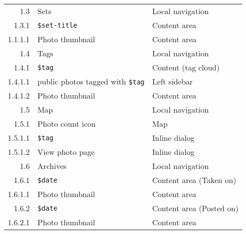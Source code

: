 \documentclass[12pt,a4paper]{article}
\newcommand{\var}[1]{\texttt{\${#1}}}
\begin{document}
\begin{table}[h!b!p!]
\begin{center}
\begin{small}
\begin{tabular}{|r|l|l|}
              1.3 &
              Sets &
              Local navigation \\

                1.3.1 &
                \var{set-title} &
                Content area \\

                  1.1.1.1 &
                  Photo thumbnail &
                  Content area \\


              1.4 &
              Tags &
              Local navigation \\

                1.4.1 &
                \var{tag} &
                Content (tag cloud) \\

                  1.4.1.1 &
                  public photos tagged with \var{tag} &
                  Left sidebar \\

                  1.4.1.2 &
                  Photo thumbnail &
                  Content area \\


              1.5 &
              Map &
              Local navigation \\

                1.5.1 &
                Photo count icon &
                Map \\

                  1.5.1.1 &
                  \var{tag} &
                  Inline dialog \\

                  1.5.1.2 &
                  View photo page &
                  Inline dialog \\

              1.6 &
              Archives &
              Local navigation \\

                1.6.1 &
                \var{date} &
                Content area (Taken on) \\

                  1.6.1.1 &
                  Photo thumbnail &
                  Content area \\

                1.6.2 &
                \var{date} &
                Content area (Posted on) \\

                  1.6.2.1 &
                  Photo thumbnail &
                  Content area \\


\end{tabular}
\end{small}
\end{center}
\end{table}
\end{document}
